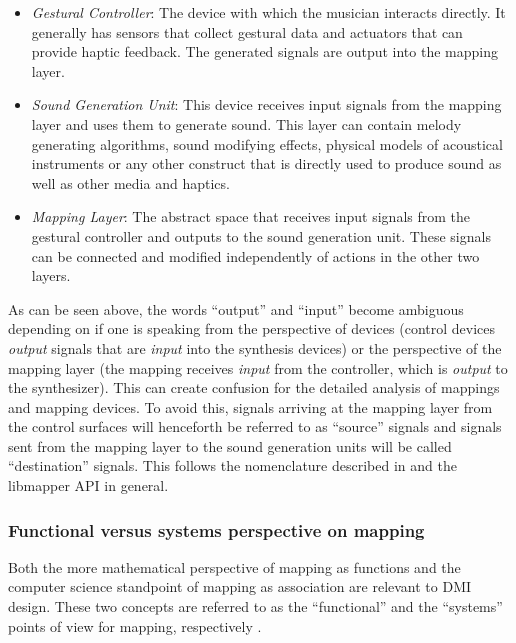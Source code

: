 	\begin{itemize}
		\item \emph{Gestural Controller}: The device with which the musician interacts directly. It generally has sensors that collect gestural data and actuators that can provide haptic feedback. The generated signals are output into the mapping layer.
		\item \emph{Sound Generation Unit}: This device receives input signals from the mapping layer and uses them to generate sound. This layer can contain melody generating algorithms, sound modifying effects, physical models of acoustical instruments or any other construct that is directly used to produce sound as well as other media and haptics.
		\item \emph{Mapping Layer}: The abstract space that receives input signals from the gestural controller and outputs to the sound generation unit. These signals can be connected and modified independently of actions in the other two layers.
	\end{itemize}

As can be seen above, the words ``output'' and ``input'' become ambiguous depending on if one is speaking from the perspective of devices (control devices \emph{output} signals that are \emph{input} into the synthesis devices) or the perspective of the mapping layer (the mapping receives \emph{input} from the controller, which is \emph{output} to the synthesizer). This can create confusion for the detailed analysis of mappings and mapping devices. To avoid this, signals arriving at the mapping layer from the control surfaces will henceforth be referred to as ``source'' signals and signals sent from the mapping layer to the sound generation units will be called ``destination'' signals. This follows the nomenclature described in  and the libmapper API in general.

	\subsubsection{Functional versus systems perspective on mapping}

Both the more mathematical perspective of mapping as functions and the computer science standpoint of mapping as association are relevant to DMI design. These two concepts are referred to as the ``functional'' and the ``systems'' points of view for mapping, respectively \cite{two_types_of_mapping}. 


